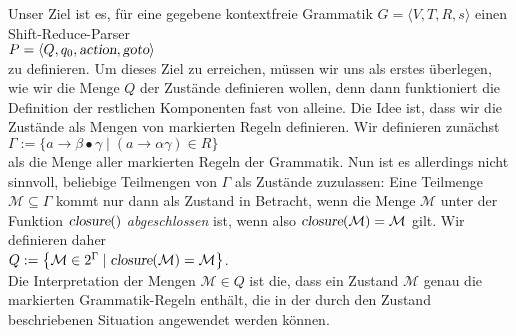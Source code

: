 \noindent
Unser Ziel ist es, f\"ur eine gegebene kontextfreie Grammatik $G = \langle V, T, R, s \rangle$ einen
Shift-Reduce-Parser 
\\[0.2cm]
\hspace*{1.3cm}
$P = \langle Q, q_0, \textsl{action}, \textsl{goto} \rangle$
\\[0.2cm]
zu definieren.  Um dieses Ziel zu erreichen, m\"ussen wir uns als erstes \"uberlegen,
wie wir die Menge $Q$ der Zust\"ande definieren wollen, denn dann funktioniert die Definition der
restlichen Komponenten fast von alleine.  Die Idee ist, dass wir die Zust\"ande
als Mengen von markierten Regeln definieren.
Wir definieren zun\"achst
\\[0.2cm]
\hspace*{1.3cm}
$\Gamma := \bigl\{ a \rightarrow \beta \bullet \gamma \mid (a \rightarrow \alpha \gamma) \in R \bigr\}$
\\[0.2cm]
als die Menge aller markierten Regeln der Grammatik.  Nun ist es allerdings nicht sinnvoll,
beliebige Teilmengen von $\Gamma$ als Zust\"ande zuzulassen:  Eine Teilmenge $\mathcal{M}
\subseteq \Gamma$ kommt nur dann als Zustand in Betracht, wenn die Menge $\mathcal{M}$ unter
der Funktion $\textsl{closure}()$ \emph{abgeschlossen} ist, wenn also
$\textsl{closure}(\mathcal{M}) = \mathcal{M}$ gilt.  Wir definieren daher
\\[0.2cm]
\hspace*{1.3cm}
$Q := \bigl\{ \mathcal{M} \in 2^\Gamma \mid \textsl{closure}(\mathcal{M}) = \mathcal{M} \bigr\}$.
\\[0.2cm]
Die Interpretation der Mengen $\mathcal{M} \in Q$ ist die, dass ein Zustand $\mathcal{M}$ genau die
markierten Grammatik-Regeln enth\"alt, die in der durch den Zustand beschriebenen Situation
angewendet werden k\"onnen.


